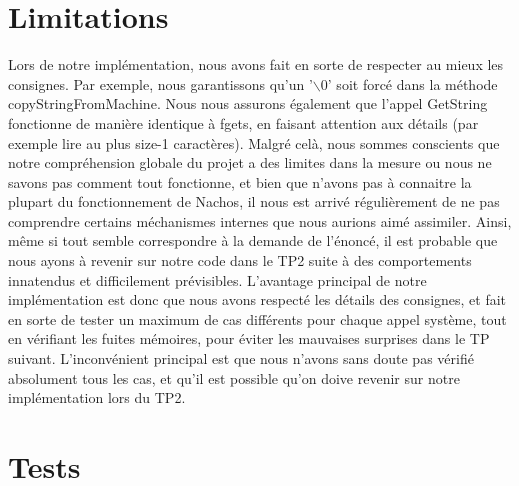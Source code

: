 \documentclass[12pt]{article}
\begin{document}
\section {Limitations}
Lors de notre implémentation, nous avons fait en sorte de respecter au mieux les consignes. Par exemple, nous garantissons qu'un '$\backslash$0' soit forcé dans la méthode \textcolor{red2}{copyStringFromMachine}. Nous nous assurons également que l'appel \textcolor{blue2}{GetString} fonctionne de manière identique à \textcolor{red2}{fgets}, en faisant attention aux détails (par exemple lire au plus size-1 caractères).
\newline
Malgré celà, nous sommes conscients que notre compréhension globale du projet a des limites dans la mesure ou nous ne savons pas comment tout fonctionne, et bien que n'avons pas à connaitre la plupart du fonctionnement de Nachos, il nous est arrivé régulièrement de ne pas comprendre certains méchanismes internes que nous aurions aimé assimiler.
Ainsi, même si tout semble correspondre à la demande de l'énoncé, il est probable que nous ayons à revenir sur notre code dans le TP2 suite à des comportements innatendus et difficilement prévisibles.
\newline
L'avantage principal de notre implémentation est donc que nous avons respecté les détails des consignes, et fait en sorte de tester un maximum de cas différents pour chaque appel système, tout en vérifiant les fuites mémoires, pour éviter les mauvaises surprises dans le TP suivant.
L'inconvénient principal est que nous n'avons sans doute pas vérifié absolument tous les cas, et qu'il est possible qu'on doive revenir sur notre implémentation lors du TP2.



\section {Tests}
\end{document}
